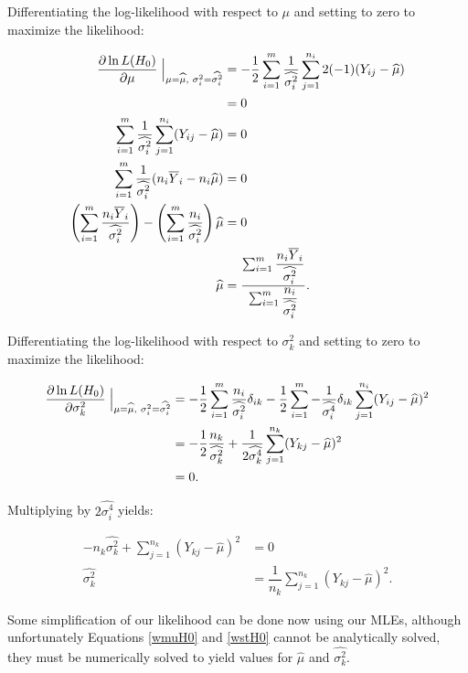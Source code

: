 \documentclass[12pt,a4paper,openright]{article}
\newcommand{\ovY}{\overline{Y}}
\newcommand{\wmu}{\widehat{\mu}}
\newcommand{\wst}[1]{\widehat{\sigma^2_#1}}
\begin{document}
	Differentiating the log-likelihood with respect to $\mu$ and setting to zero to maximize the likelihood:
	
	\begin{align}
		\dfrac{\partial \ln{L(H_0)}}{\partial \mu} \Bigm\lvert_{\mu = \wmu, \hspace{0.1cm}\sigma^2_i = \widehat{\sigma^2_i}} &= -\dfrac{1}{2} \sum_{i=1}^m \dfrac{1}{\widehat{\sigma^2_i}}\sum_{j=1}^{n_i} 2(-1)(Y_{ij}-\wmu) \nonumber\\
		&= 0 \nonumber\\
		\sum_{i=1}^m \dfrac{1}{\widehat{\sigma^2_i}}\sum_{j=1}^{n_i} (Y_{ij}-\wmu) &= 0 \nonumber\\
		\sum_{i=1}^m \dfrac{1}{\widehat{\sigma^2_i}} (n_i\ovY_i - n_i \wmu) &= 0 \nonumber\\
		\left(\sum_{i=1}^m \dfrac{n_i \ovY_i}{\widehat{\sigma^2_i}}\right) - \left(\sum_{i=1}^m \dfrac{n_i}{\widehat{\sigma^2_i}}\right)\wmu &= 0 \nonumber \\
		\wmu &= \dfrac{\sum_{i=1}^m \dfrac{n_i \ovY_i}{\widehat{\sigma^2_i}}}{\sum_{i=1}^m \dfrac{n_i}{\widehat{\sigma^2_i}}}. \label{wmuH0}
	\end{align}

	Differentiating the log-likelihood with respect to $\sigma^2_k$ and setting to zero to maximize the likelihood:
	
	\begin{align*}
		\dfrac{\partial \ln{L(H_0)}}{\partial \sigma^2_k} \Bigm\lvert_{\mu = \wmu, \hspace{0.1cm} \sigma^2_i = \widehat{\sigma^2_i}} &= -\dfrac{1}{2} \sum_{i=1}^m \dfrac{n_i}{\widehat{\sigma^2_i}}\delta_{ik} - \dfrac{1}{2} \sum_{i=1}^m -\dfrac{1}{\widehat{\sigma^4_i}} \delta_{ik}\sum_{j=1}^{n_i} (Y_{ij}-\wmu)^2 \\
		&= -\dfrac{1}{2} \dfrac{n_k}{\widehat{\sigma^2_k}} + \dfrac{1}{2\widehat{\sigma^4_k}} \sum_{j=1}^{n_k} (Y_{kj}-\wmu)^2 \\
		&= 0.
	\end{align*}

	Multiplying by $2\widehat{\sigma^4_i}$ yields:
	
	\begin{align}
		-n_k\widehat{\sigma^2_k} + \sum_{j=1}^{n_k} (Y_{kj}-\wmu)^2 &= 0 \nonumber\\
		\widehat{\sigma^2_k} &= \dfrac{1}{n_k} \sum_{j=1}^{n_k} (Y_{kj}-\wmu)^2. \label{wstH0}
	\end{align}

	Some simplification of our likelihood can be done now using our MLEs, although unfortunately Equations \ref{wmuH0} and \ref{wstH0} cannot be analytically solved, they must be numerically solved to yield values for $\wmu$ and $\wst{k}$.  
	
\end{document}
